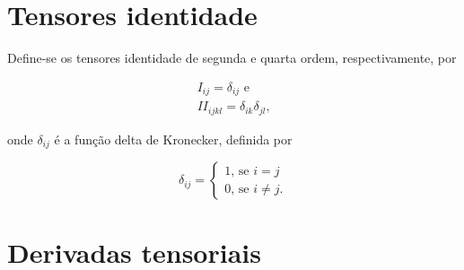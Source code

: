 \documentclass[_ArquivoPrincipal.tex]{subfiles}
\begin{document}
\section{Tensores identidade}

Define-se os tensores identidade de segunda e quarta ordem, respectivamente, por

\begin{gather}
I_{ij}=\delta_{ij} \text{ e} \label{eq:Id2} \\
II_{ijkl}=\delta_{ik}\delta_{jl} \text{,}\label{eq:Id4}
\end{gather}

\noindent onde $\delta_{ij}$ é a função delta de Kronecker, definida por

\begin{equation}\label{eq:kronecker}
\delta_{ij}=\begin{cases}
1\text{, se } i=j \\ 0\text{, se } i\ne j \text{.}
\end{cases}
\end{equation}

\section{Derivadas tensoriais}
\end{document}
